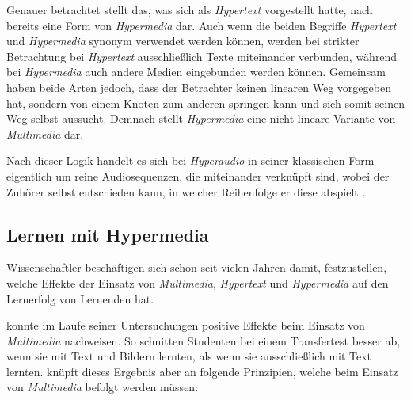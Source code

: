 Genauer betrachtet stellt das, was \cite{nelson1965complex} sich als \textit{Hypertext} vorgestellt hatte, nach \cite{nielsen2013multimedia} bereits eine Form von \textit{Hypermedia} dar. Auch wenn die beiden Begriffe \textit{Hypertext} und \textit{Hypermedia} synonym verwendet werden können, werden bei strikter Betrachtung bei \textit{Hypertext} ausschließlich Texte miteinander verbunden, während bei \textit{Hypermedia} auch andere Medien eingebunden werden können. Gemeinsam haben beide Arten jedoch, dass der Betrachter keinen linearen Weg vorgegeben hat, sondern von einem Knoten zum anderen springen kann und sich somit seinen Weg selbst aussucht. Demnach stellt \textit{Hypermedia} eine nicht-lineare Variante von \textit{Multimedia} dar.

Nach dieser Logik handelt es sich bei \textit{Hyperaudio} in seiner klassischen Form eigentlich um reine Audiosequenzen, die miteinander verknüpft sind, wobei der Zuhörer selbst entschieden kann, in welcher Reihenfolge er diese abspielt \citep{zumbach2006learning}.


\subsection{Lernen mit Hypermedia}
Wissenschaftler beschäftigen sich schon seit vielen Jahren damit, festzustellen, welche Effekte der Einsatz von \textit{Multimedia}, \textit{Hypertext} und \textit{Hypermedia} auf den Lernerfolg von Lernenden hat.


\cite{mayer2009multimedia} konnte im Laufe seiner Untersuchungen positive Effekte beim Einsatz von \textit{Multimedia} nachweisen. So schnitten Studenten bei einem Transfertest besser ab, wenn sie mit Text und Bildern lernten, als wenn sie ausschließlich mit Text lernten. \cite{mayer2009multimedia} knüpft dieses Ergebnis aber an folgende Prinzipien, welche beim Einsatz von \textit{Multimedia} befolgt werden müssen:

